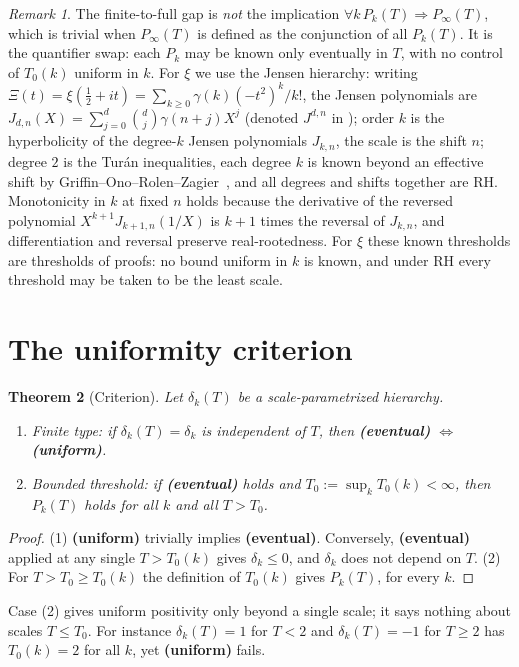 \documentclass[11pt]{amsart}
\newtheorem{theorem}{Theorem}[section]
\theoremstyle{definition}
\theoremstyle{remark}
\newtheorem{remark}[theorem]{Remark}
\begin{document}
\begin{remark}
The finite-to-full gap is \emph{not} the implication $\forall k\,P_k(T)\Rightarrow
P_\infty(T)$, which is trivial when $P_\infty(T)$ is defined as the conjunction
of all $P_k(T)$. It is the quantifier swap: each $P_k$ may be known only eventually
in $T$, with no control of $T_0(k)$ uniform in $k$. For $\xi$ we use the Jensen hierarchy: writing
$\Xi(t)=\xi(\tfrac12+it)=\sum_{k\ge0}\gamma(k)(-t^2)^k/k!$, the Jensen
polynomials are $J_{d,n}(X)=\sum_{j=0}^d\binom dj\gamma(n+j)X^j$ (denoted
$J^{d,n}$ in \cite{RP14}); order $k$ is the hyperbolicity of the
degree-$k$ Jensen polynomials $J_{k,n}$, the scale is the shift $n$; degree $2$
is the Tur\'an inequalities, each degree $k$ is known beyond an effective shift
by Griffin--Ono--Rolen--Zagier~\cite{GORZ}, and all degrees and shifts together
are RH. Monotonicity in $k$ at fixed $n$ holds because the derivative of the
reversed polynomial $X^{k+1}J_{k+1,n}(1/X)$ is $k+1$ times the reversal of
$J_{k,n}$, and differentiation and reversal preserve real-rootedness. For $\xi$
these known thresholds are thresholds of proofs: no bound uniform in $k$ is known,
and under RH every threshold may be taken to be the least scale.
\end{remark}

\section{The uniformity criterion}
\begin{theorem}[Criterion]\label{thm:crit}
Let $\delta_k(T)$ be a scale-parametrized hierarchy.
\begin{enumerate}
\item \emph{Finite type:} if $\delta_k(T)=\delta_k$ is independent of $T$, then
\textbf{(eventual)} $\iff$ \textbf{(uniform)}.
\item \emph{Bounded threshold:} if \textbf{(eventual)} holds and
$T_0:=\sup_kT_0(k)<\infty$, then $P_k(T)$ holds for all $k$ and all $T>T_0$.
\end{enumerate}
\end{theorem}
\begin{proof}
(1) \textbf{(uniform)} trivially implies \textbf{(eventual)}. Conversely,
\textbf{(eventual)} applied at any single $T>T_0(k)$ gives $\delta_k\le0$, and
$\delta_k$ does not depend on $T$. (2) For $T>T_0\ge T_0(k)$ the definition of
$T_0(k)$ gives $P_k(T)$, for every $k$.
\end{proof}
Case (2) gives uniform positivity only beyond a single scale; it says nothing
about scales $T\le T_0$. For instance $\delta_k(T)=1$ for $T<2$ and $\delta_k(T)=-1$
for $T\ge2$ has $T_0(k)=2$ for all $k$, yet \textbf{(uniform)} fails.
\end{document}
